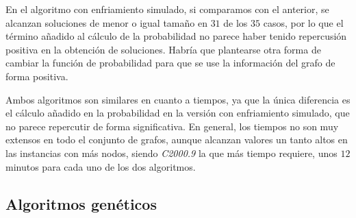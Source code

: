 En el algoritmo con enfriamiento simulado, si comparamos con el anterior, se
alcanzan soluciones de menor o igual tamaño en $31$ de los $35$ casos, por lo que
el término añadido al cálculo de la probabilidad no parece haber tenido repercusión
positiva en la obtención de soluciones. Habría que plantearse otra forma de cambiar
la función de probabilidad para que se use la información del grafo de forma positiva.

Ambos algoritmos son similares en cuanto a tiempos, ya que la única diferencia es
el cálculo añadido en la probabilidad en la versión con enfriamiento simulado,
que no parece repercutir de forma significativa. En general, los tiempos no son
muy extensos en todo el conjunto de grafos, aunque alcanzan valores un tanto altos
en las instancias con más nodos, siendo \textit{C2000.9} la que más tiempo requiere,
unos $12$ minutos para cada uno de los dos algoritmos.

\subsection{Algoritmos genéticos}

